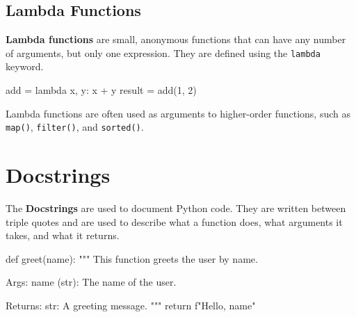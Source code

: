 \subsection*{Lambda Functions}

\textbf{Lambda functions} are small, anonymous functions that can have any number of arguments, but only one expression. They are defined using the \texttt{lambda} keyword.

\begin{codeblock}[language=python]
add = lambda x, y: x + y
result = add(1, 2)
\end{codeblock}

Lambda functions are often used as arguments to higher-order functions, such as \texttt{map()}, \texttt{filter()}, and \texttt{sorted()}.



\section{Docstrings}

The \textbf{Docstrings} are used to document Python code. They are written between triple quotes and are used to describe what a function does, what arguments it takes, and what it returns.

\begin{codeblock}[language=python]
def greet(name):
    """
    This function greets the user by name.
    
    Args:
        name (str): The name of the user.
    
    Returns:
        str: A greeting message.
    """
    return f"Hello, {name}"
\end{codeblock}





